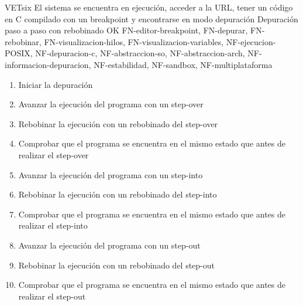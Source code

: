     \begin{testCase}{VET}{six}
        {El sistema se encuentra en ejecución, acceder a la URL, tener un código en C compilado con un breakpoint y encontrarse en modo depuración}
        {\NA}
        {Depuración paso a paso con rebobinado}
        {OK}
        {FN-editor-breakpoint, FN-depurar, FN-rebobinar, FN-visualizacion-hilos, FN-visualizacion-variables, NF-ejecucion-POSIX, NF-depuracion-c, NF-abstraccion-so, NF-abstraccion-arch, NF-informacion-depuracion, NF-estabilidad, NF-sandbox, NF-multiplataforma}
        \begin{enumerate}
            \item Iniciar la depuración
            \item Avanzar la ejecución del programa con un step-over
            \item Rebobinar la ejecución con un rebobinado del step-over
            \item Comprobar que el programa se encuentra en el mismo estado que antes de realizar el step-over
            \item Avanzar la ejecución del programa con un step-into
            \item Rebobinar la ejecución con un rebobinado del step-into
            \item Comprobar que el programa se encuentra en el mismo estado que antes de realizar el step-into
            \item Avanzar la ejecución del programa con un step-out
            \item Rebobinar la ejecución con un rebobinado del step-out
            \item Comprobar que el programa se encuentra en el mismo estado que antes de realizar el step-out
        \end{enumerate}
    \end{testCase}
    
